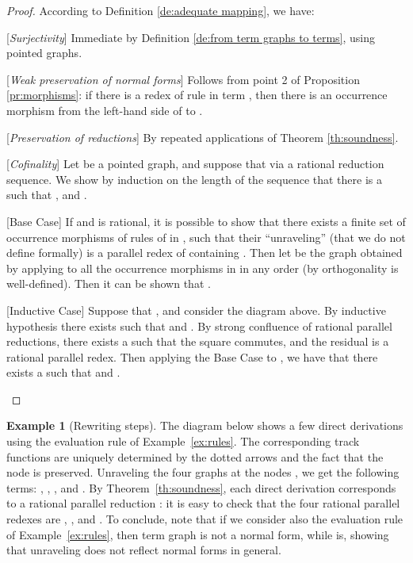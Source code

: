 \documentclass{eptcs}
\theoremstyle{plain}
\theoremstyle{definition}
\newtheorem{example}[theorem]{Example}
\begin{document}
\begin{proof}
According to Definition \ref{de:adequate mapping}, we have:
\begin{description}
\item {[{\em Surjectivity}]} Immediate by Definition \ref{de:from term 
graphs to terms}, using pointed graphs.

\item {[{\em Weak preservation of normal forms}]} Follows  
from point 2 of Proposition \ref{pr:morphisms}: if there is a redex of 
rule  in term , then there is an occurrence 
morphism from the left-hand side of  to .  
\item {[{\em Preservation of reductions}]} By repeated applications of 
Theorem \ref{th:soundness}.

\item {[{\em Cofinality}]} Let  be a pointed graph, and suppose 
that  via a rational reduction sequence. 
We show by induction on the length of the sequence that there is a 
 such that , and .

\begin{description} 

\item {[Base Case]} If   and  is 
rational, it is possible to show that there exists a finite set  of 
occurrence morphisms of rules of  in , such that their 
``unraveling'' (that we do not define formally)  is a 
parallel redex of  containing . Then let  be 
the graph obtained 
by applying to  all the occurrence morphisms in  in any order 
(by orthogonality  is well-defined). Then it can be shown that .

 



\item {[Inductive Case]}  Suppose that , and consider the diagram above.
By 
inductive hypothesis there exists  such 
that  and . By 
strong confluence of rational parallel reductions, there exists a 
 such that the square commutes, and the residual  is a rational parallel redex. Then applying the Base 
Case to , we have 
that there exists a  such that  and . 
\end{description}
\end{description}
\end{proof}

\begin{example}[Rewriting steps]
The diagram below
shows a few direct derivations using the evaluation rule  of Example~\ref{ex:rules}. The corresponding track functions are uniquely determined by the dotted arrows and the fact that the  node is preserved. Unraveling the four graphs at the nodes , we get the following terms: , , , and . By Theorem~\ref{th:soundness}, each direct derivation   corresponds to a rational parallel reduction : it is easy to check that the four rational parallel redexes are , ,  and . 
To conclude, note that if we consider also the evaluation rule  of Example~\ref{ex:rules}, then term graph  is not a normal form, while  is, showing that unraveling does not reflect normal forms in general.
\end{example}
\end{document}
